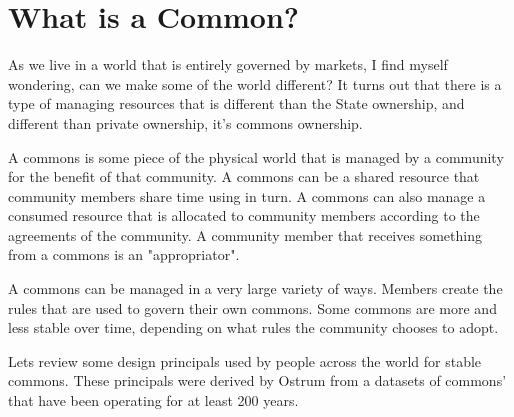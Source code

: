 	\section{What is a Common?}

\vspace{0.2cm}

As we live in a world that is entirely governed by markets, I find myself wondering, can we make some of the world different? It turns out that there is a type of managing resources that is different than the State ownership, and different than private ownership, it's commons ownership. 

A commons is some piece of the physical world that is managed by a community for the benefit of that community. A commons can be a shared resource that community members share time using in turn. A commons can also manage a consumed resource that is allocated to community members according to the agreements of the community. A community member that receives something from a commons is an "appropriator".

A commons can be managed in a very large variety of ways. Members create the rules that are used to govern their own commons. Some commons are more and less stable over time, depending on what rules the community chooses to adopt. 


Lets review some design principals used by people across the world for stable commons. These principals were derived by Ostrum from a datasets of commons' that have been operating for at least 200 years. 

